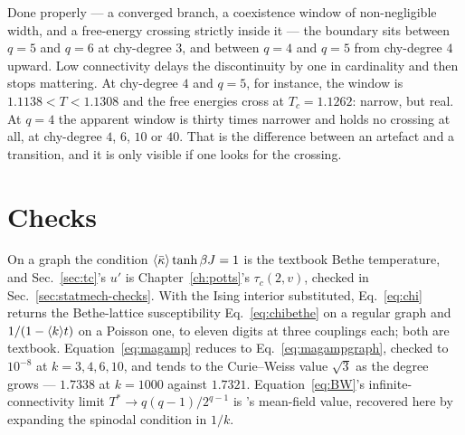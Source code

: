 Done properly --- a converged branch, a coexistence window of non-negligible
width, and a free-energy crossing strictly inside it --- the boundary sits
between $q=5$ and $q=6$ at chy-degree $3$, and between $q=4$ and $q=5$ from
chy-degree $4$ upward. Low connectivity delays the discontinuity by one in
cardinality and then stops mattering. At chy-degree $4$ and $q=5$, for instance,
the window is $1.1138<T<1.1308$ and the free energies cross at $T_{c}=1.1262$:
narrow, but real. At $q=4$ the apparent window is thirty times narrower and
holds no crossing at all, at chy-degree $4$, $6$, $10$ or $40$. That is the
difference between an artefact and a transition, and it is only visible if one
looks for the crossing.

\section{Checks}
\label{sec:ising-checks}

On a graph the condition $\langle \bar\kappa \rangle\tanh\beta J=1$ is the textbook Bethe
temperature, and Sec.~\ref{sec:tc}'s $u'$ is Chapter~\ref{ch:potts}'s
$\tau_{c}(2,v)$, checked in Sec.~\ref{sec:statmech-checks}.
With the Ising interior substituted, Eq.~\eqref{eq:chi} returns the
Bethe-lattice susceptibility Eq.~\eqref{eq:chibethe} on a regular graph and
$1/(1-\langle k \rangle t)$ on a Poisson one, to eleven digits at three couplings each;
both are textbook. Equation~\eqref{eq:magamp} reduces to
Eq.~\eqref{eq:magampgraph}, checked to $10^{-8}$ at $k=3,4,6,10$, and tends to
the Curie--Weiss value $\sqrt3$ as the degree grows --- $1.7338$ at $k=1000$
against $1.7321$. Equation~\eqref{eq:BW}'s infinite-connectivity limit
$T^{*}\to q(q-1)/2^{q-1}$ is \citeauthor{son2026}'s mean-field value, recovered
here by expanding the spinodal condition in $1/k$.

